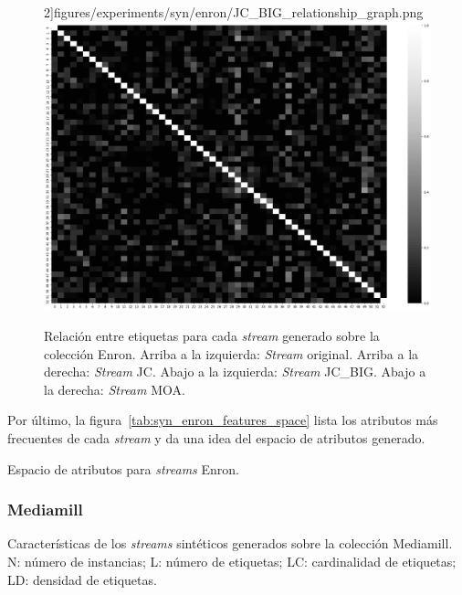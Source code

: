 \begin{figure}[htbp]
		2]{figures/experiments/syn/enron/JC_BIG_relationship_graph.png}
	\includegraphics[width=\linewidth /
		2]{figures/experiments/syn/enron/MOA_relationship_graph.png}
	\caption[Relación entre etiquetas para cada \textit{stream} generado sobre
		la colección Enron.]{Relación entre etiquetas para cada \textit{stream} generado sobre
		la colección Enron. Arriba a la izquierda: \textit{Stream} original. Arriba a la
		derecha: \textit{Stream} JC. Abajo a la izquierda: \textit{Stream}
		JC\_BIG. Abajo a la derecha: \textit{Stream} MOA.}
	\label{fig:syn_enron_label_relationship}
\end{figure}

Por último, la figura~\ref{tab:syn_enron_features_space} lista los atributos más
frecuentes de cada \textit{stream} y da una idea del espacio de atributos
generado.

\begin{table}[htbp]
	\centering
	\begin{adjustbox}{max width=\textwidth}
		
	\end{adjustbox}
	\caption{Espacio de atributos para \textit{streams} Enron.}
	\label{tab:syn_enron_features_space}
\end{table}

\subsubsection{Mediamill}

\begin{table}[htbp]
	\centering
	\begin{adjustbox}{max width=\textwidth}
		
	\end{adjustbox}
	\caption[Características de los \textit{streams} sintéticos generados sobre
		la colección Mediamill.]{Características de los \textit{streams} sintéticos generados sobre
		la colección Mediamill.  N: número de instancias; L: número de etiquetas; LC:
		cardinalidad de etiquetas; LD: densidad de etiquetas.}
	\label{tab:syn_mediamill_stats}
\end{table}

